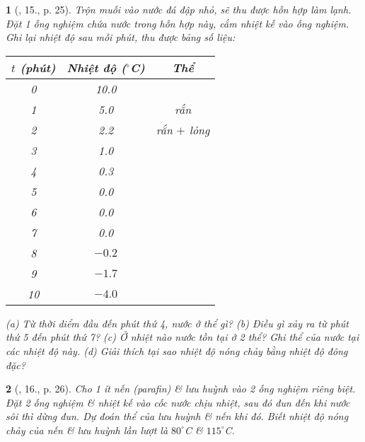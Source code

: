 \documentclass{article}
\newtheorem{baitoan}{}
\begin{document}
\begin{baitoan}[\cite{ncpt_KHTN_6_tap_1}, 15., p. 25]
	Trộn muối vào nước đá đập nhỏ, sẽ thu được hỗn hợp làm lạnh. Đặt 1 ống nghiệm chứa nước trong hỗn hợp này, cắm nhiệt kế vào ống nghiệm. Ghi lại nhiệt độ sau mỗi phút, thu được bảng số liệu:
	\begin{table}[H]
		\centering
		\begin{tabular}{|c|c|c|}
			\hline
			$t$ (phút) & Nhiệt độ (${}^\circ$C) & Thể \\
			\hline
			0 & 10.0 &  \\
			\hline
			1 & 5.0 & rắn \\
			\hline
			2 & 2.2 & rắn $+$ lỏng \\
			\hline
			3 & 1.0 &  \\
			\hline
			4 & 0.3 &  \\
			\hline
			5 & 0.0 &  \\
			\hline
			6 & 0.0 &  \\
			\hline
			7 & 0.0 &  \\
			\hline
			8 & $-0.2$ &  \\
			\hline
			9 & $-1.7$ &  \\
			\hline
			10 & $-4.0$ &  \\
			\hline
		\end{tabular}
	\end{table}
	\noindent(a) Từ thời diểm đầu đến phút thứ 4, nước ở thể gì? (b) Điều gì xảy ra từ phút thứ 5 đến phút thứ 7? (c) Ở nhiệt nào nước tồn tại ở 2 thể? Ghi thể của nước tại các nhiệt độ này. (d) Giải thích tại sao nhiệt độ nóng chảy bằng nhiệt độ đông đặc?
\end{baitoan}

\begin{baitoan}[\cite{ncpt_KHTN_6_tap_1}, 16., p. 26]
	Cho 1 ít nến (parafin) \& lưu huỳnh vào 2 ống nghiệm riêng biệt. Đặt 2 ống nghiệm \& nhiệt kế vào cốc nước chịu nhiệt, sau đó đun đến khi nước sôi thì dừng đun. Dự đoán thể của lưu huỳnh \& nến khi đó. Biết nhiệt độ nóng chảy của nến \& lưu huỳnh lần lượt là $80^\circ${\rm C} \& $115^\circ${\rm C}.
\end{baitoan}
\end{document}
